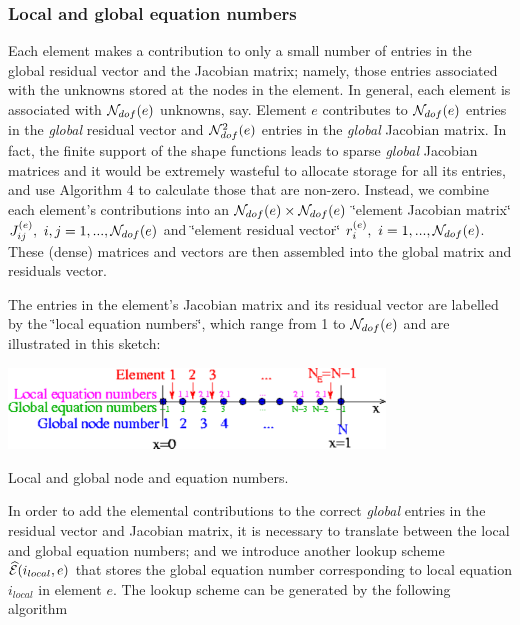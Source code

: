 \hypertarget{index_local_eqn_numbers}{}\subsubsection{Local and global equation numbers}\label{index_local_eqn_numbers}
Each element makes a contribution to only a small number of entries in the global residual vector and the Jacobian matrix; namely, those entries associated with the unknowns stored at the nodes in the element. In general, each element is associated with $ {\cal N}_{dof}(e)$ unknowns, say. Element $e$ contributes to $ {\cal N}_{dof}(e)$ entries in the {\itshape global} residual vector and $ {\cal N}^2_{dof}(e)$ entries in the {\itshape global} Jacobian matrix. In fact, the finite support of the shape functions leads to sparse {\itshape global} Jacobian matrices and it would be extremely wasteful to allocate storage for all its entries, and use Algorithm 4 to calculate those that are non-\/zero. Instead, we combine each element's contributions into an $ {\cal N}_{dof}(e) \times {\cal N}_{dof}(e) $ \char`\"{}element Jacobian matrix\char`\"{} $ J_{ij}^{(e)}, \ i,j=1,...,{\cal N}_{dof}(e) $ and \char`\"{}element residual vector\char`\"{} $ r_{i}^{(e)}, \ i=1,..., {\cal N}_{dof}(e) $. These (dense) matrices and vectors are then assembled into the global matrix and residuals vector.

The entries in the element's Jacobian matrix and its residual vector are labelled by the \char`\"{}local equation numbers\char`\"{}, which range from 1 to $ {\cal N}_{dof}(e)$ and are illustrated in this sketch\-:  
\begin{DoxyImage}
\includegraphics[width=0.75\textwidth]{1Dmesh_local_and_global_node_and_equation_numbers}
\caption{Local and global node and equation numbers. }
\end{DoxyImage}


In order to add the elemental contributions to the correct {\itshape global} entries in the residual vector and Jacobian matrix, it is necessary to translate between the local and global equation numbers; and we introduce another lookup scheme $ \widehat{\cal E}(i_{local},e)$ that stores the global equation number corresponding to local equation $i_{local}$ in element $e$. The lookup scheme can be generated by the following algorithm

